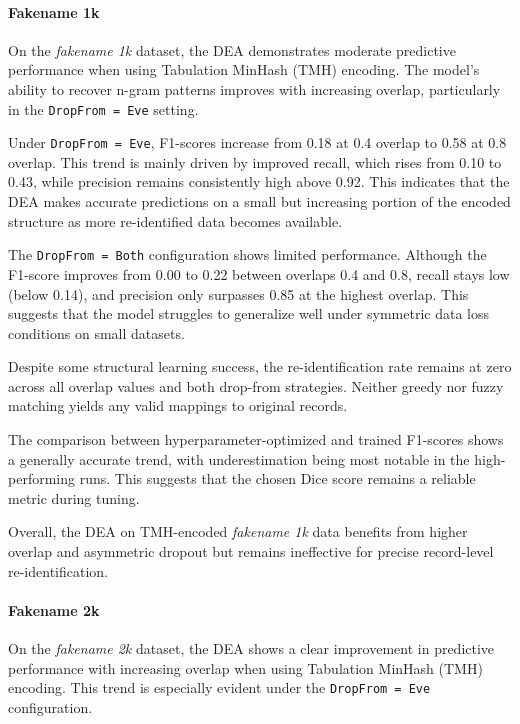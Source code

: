 \paragraph{Fakename 1k}

On the \textit{fakename 1k} dataset, the DEA demonstrates moderate predictive performance when using Tabulation MinHash (TMH) encoding. The model's ability to recover n-gram patterns improves with increasing overlap, particularly in the \texttt{DropFrom = Eve} setting.

Under \texttt{DropFrom = Eve}, F1-scores increase from 0.18 at 0.4 overlap to 0.58 at 0.8 overlap. This trend is mainly driven by improved recall, which rises from 0.10 to 0.43, while precision remains consistently high above 0.92. This indicates that the DEA makes accurate predictions on a small but increasing portion of the encoded structure as more re-identified data becomes available.

The \texttt{DropFrom = Both} configuration shows limited performance. Although the F1-score improves from 0.00 to 0.22 between overlaps 0.4 and 0.8, recall stays low (below 0.14), and precision only surpasses 0.85 at the highest overlap. This suggests that the model struggles to generalize well under symmetric data loss conditions on small datasets.

Despite some structural learning success, the re-identification rate remains at zero across all overlap values and both drop-from strategies. Neither greedy nor fuzzy matching yields any valid mappings to original records.

The comparison between hyperparameter-optimized and trained F1-scores shows a generally accurate trend, with underestimation being most notable in the high-performing runs. This suggests that the chosen Dice score remains a reliable metric during tuning.

Overall, the DEA on TMH-encoded \textit{fakename 1k} data benefits from higher overlap and asymmetric dropout but remains ineffective for precise record-level re-identification.


\paragraph{Fakename 2k}

On the \textit{fakename 2k} dataset, the DEA shows a clear improvement in predictive performance with increasing overlap when using Tabulation MinHash (TMH) encoding. This trend is especially evident under the \texttt{DropFrom = Eve} configuration.

